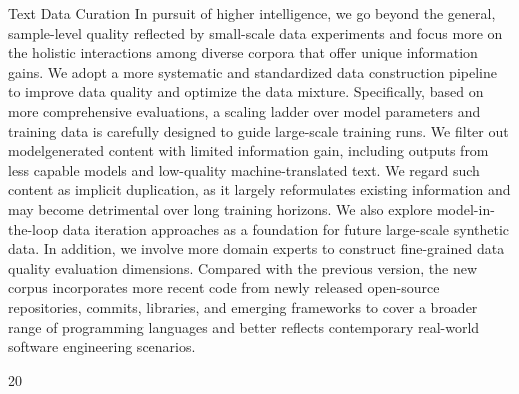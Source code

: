 \documentclass[
  10
]{article}
\begin{document}
Text Data Curation In pursuit of higher intelligence, we go beyond the
general, sample-level quality reflected by small-scale data experiments
and focus more on the holistic interactions among diverse corpora that
offer unique information gains. We adopt a more systematic and
standardized data construction pipeline to improve data quality and
optimize the data mixture. Specifically, based on more comprehensive
evaluations, a scaling ladder over model parameters and training data is
carefully designed to guide large-scale training runs. We filter out
modelgenerated content with limited information gain, including outputs
from less capable models and low-quality machine-translated text. We
regard such content as implicit duplication, as it largely reformulates
existing information and may become detrimental over long training
horizons. We also explore model-in-the-loop data iteration approaches as
a foundation for future large-scale synthetic data. In addition, we
involve more domain experts to construct fine-grained data quality
evaluation dimensions. Compared with the previous version, the new
corpus incorporates more recent code from newly released open-source
repositories, commits, libraries, and emerging frameworks to cover a
broader range of programming languages and better reflects contemporary
real-world software engineering scenarios.

20
\end{document}
